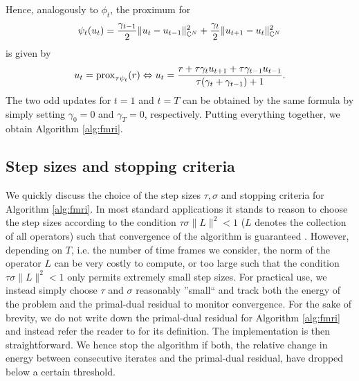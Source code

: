 Hence, analogously to $\phi_t$, the proximum for 
\begin{align*}
	\psi_t(u_t) = \frac{\gamma_{t-1}}{2} \|u_t - u_{t-1}\|_{\mathbb{C}^N}^2 + \frac{\gamma_t}{2} \|u_{t+1} - u_t\|_{\mathbb{C}^N}^2
\end{align*}
is given by 
\begin{align*}
	u_t = \mathrm{prox}_{\tau \psi_t} (r) \Leftrightarrow u_t = \frac{r + \tau \gamma_t u_{t+1} + \tau \gamma_{t-1} u_{t-1}}{\tau (\gamma_t + \gamma_{t-1}) + 1}. 
\end{align*}
The two odd updates for $t = 1$ and $t = T$ can be obtained by the same formula by simply setting $\gamma_0 = 0$ and $\gamma_T = 0$, respectively.
Putting everything together, we obtain Algorithm \ref{alg:fmri}.\\

\subsection{Step sizes and stopping criteria}
We quickly discuss the choice of the step sizes $\tau, \sigma$ and stopping criteria for Algorithm \ref{alg:fmri}. 
In most standard applications it stands to reason to choose the step sizes according to the condition $\tau \sigma \| L \|^2 < 1$ ($L$ denotes the collection of all operators) such that convergence of the algorithm is guaranteed \cite{ChambollePock}.
However, depending on $T$, i.e. the number of time frames we consider, the norm of the operator $L$ 
can be very costly to compute, or too large such that the condition $\tau \sigma \| L \|^2 < 1$ only permits extremely small step sizes. 
For practical use, we instead simply choose $\tau$ and $\sigma$ reasonably ''small`` and track both the energy of the problem and the primal-dual residual \cite{Goldstein:Adaptive} to monitor convergence. 
For the sake of brevity, we do not write down the primal-dual residual for Algorithm \ref{alg:fmri} and instead refer the reader to \cite{Goldstein:Adaptive} for its definition. 
The implementation is then straightforward.
We hence stop the algorithm if both, the relative change in energy between consecutive iterates and the primal-dual residual, have dropped below a certain threshold.

